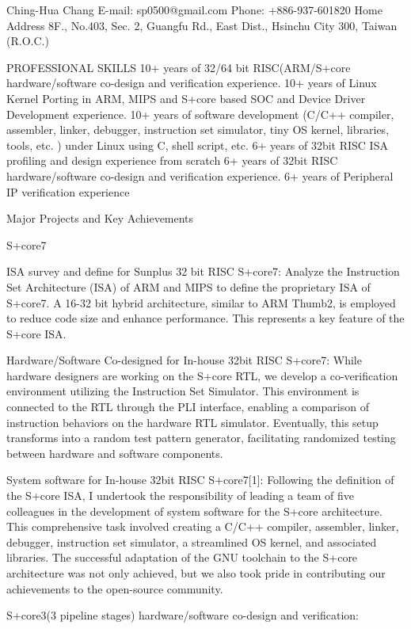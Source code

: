 
Ching-Hua Chang
E-mail: sp0500@gmail.com
Phone: +886-937-601820
Home Address
8F., No.403, Sec. 2, Guangfu Rd., East Dist., Hsinchu City 300, Taiwan (R.O.C.)




PROFESSIONAL SKILLS
10+ years of 32/64 bit RISC(ARM/S+core hardware/software co-design and verification experience.
10+ years of Linux Kernel Porting in ARM, MIPS and S+core based SOC and Device Driver Development experience.
10+ years of software development (C/C++ compiler, assembler, linker, debugger, instruction set simulator, tiny OS kernel, libraries, tools, etc. ) under Linux using C, shell script, etc.
6+ years of 32bit RISC ISA profiling and design experience from scratch
6+ years of 32bit RISC hardware/software co-design and verification experience.
6+ years of Peripheral IP verification experience



Major Projects and Key Achievements

S+core7

ISA survey and define for Sunplus 32 bit RISC S+core7:
Analyze the Instruction Set Architecture (ISA) of ARM and MIPS to define the proprietary ISA of S+core7.
A 16-32 bit hybrid architecture, similar to ARM Thumb2, is employed to reduce code size and enhance performance. This represents a key feature of the S+core ISA.


Hardware/Software Co-designed for In-house 32bit RISC S+core7:
While hardware designers are working on the S+core RTL, we develop a co-verification environment utilizing the Instruction Set Simulator.
This environment is connected to the RTL through the PLI interface, enabling a comparison of instruction behaviors on the hardware RTL simulator.
Eventually, this setup transforms into a random test pattern generator, facilitating randomized testing between hardware and software components.

System software for In-house 32bit RISC S+core7[1]:
Following the definition of the S+core ISA, I undertook the responsibility of leading a team of five colleagues in the development of system software for the S+core architecture. This comprehensive task involved creating a C/C++ compiler, assembler, linker, debugger, instruction set simulator, a streamlined OS kernel, and associated libraries.
The successful adaptation of the GNU toolchain to the S+core architecture was not only achieved, but we also took pride in contributing our achievements to the open-source community.

S+core3(3 pipeline stages) hardware/software co-design and verification:

